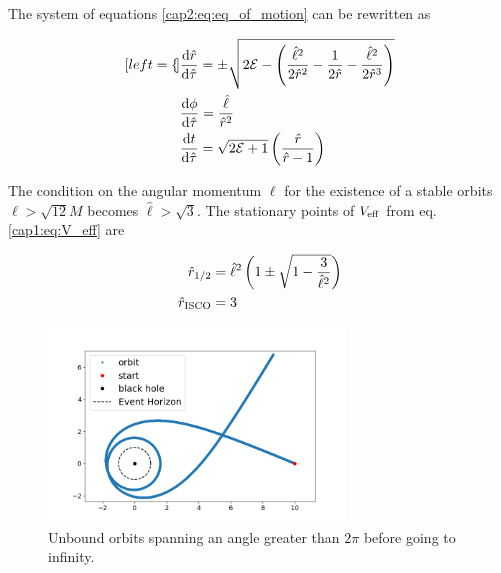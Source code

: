 The system of equations \eqref{cap2:eq:eq_of_motion} can be rewritten as

\begin{subequations}
    \begin{align}[left = {\empheqlbrace}]
        &\dv{\hat r}{\hat \tau} = \pm \sqrt{2 \mathcal E
        - \left(\frac{\hat \ell^2}{2 \hat r^2} - \frac{1}{2 \hat r}
        - \frac{\hat \ell^2}{2 \hat r^3} \right)}
        \label{cap2:eq:radial_eq_dimless} \\
        &\dv{\phi}{\hat \tau} = \frac{\hat \ell}{\hat r^2}
        \label{cap2:eq:angular_eq_dimless} \\
        &\dv{t}{\hat \tau} = \sqrt{2 \mathcal E + 1}
        \left(\frac{\hat r}{\hat r - 1}\right) \label{cap2:eq:time_eq_dimless}
    \end{align}
    \label{cap2:eq:eq_of_motion_dimless}
\end{subequations}

The condition on the angular momentum $\ell$ for the existence of a stable
orbits $\ell > \sqrt{12} M$ becomes $\hat \ell > \sqrt{3}$.
The stationary points of $V_{\rm eff}$ from eq. \eqref{cap1:eq:V_eff} are

\begin{subequations}
    \begin{align}
        \hat r_{1 / 2} &= \hat \ell^2
        \left(1 \pm \sqrt{1 - \frac{3}{\hat \ell^2}} \right)\\
        \hat r_{\rm ISCO} &= 3
    \end{align}
\end{subequations}

\begin{figure}[h]
    \centering
    \includegraphics[width=0.7\textwidth]{Figures/chapter2/cool.png}
    \caption{Unbound orbits spanning an angle greater than $2 \pi$ before going
    to infinity.}
    \label{cap2:fig:V_eff}
\end{figure}
